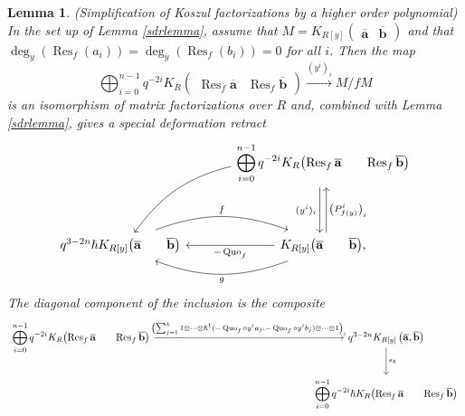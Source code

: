 \documentclass{article}
\DeclareMathOperator{\Res}{Res}
\DeclareMathOperator{\Quo}{Quo}
\newcommand{\kmf}[2]{
	K_{#1}{\begin{pmatrix}
			#2
		\end{pmatrix}
	}	
}
\theoremstyle{plain} %
\newtheorem{lemma}[theorem]{Lemma}
\theoremstyle{definition} %
\theoremstyle{remark} %
\begin{document}
\begin{lemma}\label{lemma:sdrkoszul}\emph{(Simplification of Koszul factorizations by a higher order polynomial)}
	In the set up of Lemma \ref{sdrlemma}, assume that $M=\kmf{R[y]}{\mathbf{\overline a} &\mathbf{\overline b}}$ and that $\deg_y(\Res_f(a_i))=\deg_y(\Res_f(b_i))=0$ for all $i$. Then the map
	$$
		\displaystyle\bigoplus_{i=0}^{n-1}q^{-2i}\kmf{R}{\Res_f\mathbf{\overline a} & \Res_f\mathbf{\overline b}} 
		\xrightarrow{(y^i)_i}
		M/fM
	$$ 
	is an isomorphism of matrix factorizations over $R$ and, combined with Lemma \ref{sdrlemma}, gives a special deformation retract
	$$
		\begin{tikzcd}[column sep=large, ]
			&
			\displaystyle\bigoplus_{i=0}^{n-1}q^{-2i} \kmf{R}{\Res_f\mathbf{\overline a} & \Res_f\mathbf{\overline b}} 
			\ar[dd, shift right=0.6ex, "(y^i)_i", swap]
			\ar[dd, leftarrow, shift left=0.6ex, "\left(P^i_{f(y)}\right)_i"]
			\arrow[ddl, "{}", bend right=20, swap]
			\\
			\\
			q^{3-2n}\hslash \kmf{R[y]}{\mathbf{\overline a} & \mathbf{\overline b}}
			\arrow[r, "f", shift left=0.5ex, bend left=20]
			& 
			\kmf{R[y]}{\mathbf{\overline a} & \mathbf{\overline b}}
			\ar[l, "-\Quo_f"]
			\arrow[l, "g", shift left=0.5ex, bend left=20]
			, 
		\end{tikzcd}
	$$
	The diagonal component of the inclusion is the composite
	$$
	\begin{tikzcd}[column sep=5.5cm]
		\displaystyle\bigoplus_{i=0}^{n-1}q^{-2i}\kmf{R}{\Res_f\mathbf{\overline a} & \Res_f\mathbf{\overline b}} 
		\arrow[r, "{\left(\sum_{j=1}^k1\otimes\cdots \otimes\hslash^1(-\Quo_f\circ y^i a_j,-\Quo_f\circ y^i b_j)\otimes\cdots\otimes 1\right)_i}"] 
		& 
		q^{3-2n}K_{R[y]}\left(\mathbf{\overline a},\mathbf{\overline b}\right)
		\arrow[d,"s_\hslash"] 
		\\
		&
		\displaystyle\bigoplus_{i=0}^{n-1}q^{-2i}\hslash\kmf{R}{\Res_f\mathbf{\overline a} & \Res_f\mathbf{\overline b}} 
	\end{tikzcd}
	$$
\end{lemma}
\end{document}

